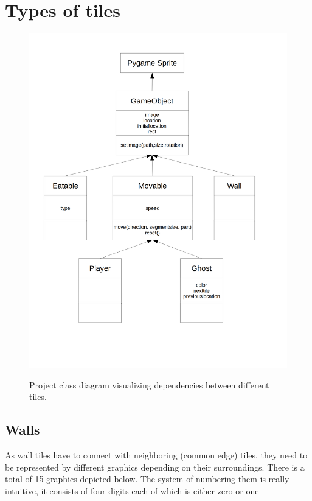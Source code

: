 \documentclass[11pt,a4paper,notitlepage]{report}
\newcommand{\dsubsection}[1]{\FloatBarrier \subsection{#1}}
\newenvironment{img}{
	\begin{center}
		\begin{figure}[H]
			\begin{center}
			
}{
	\end{center}
		\end{figure}
			\end{center}
}
\begin{document}
		\section{Types of tiles}
			\begin{img}
				\includegraphics[width=400pt]{images/class_diagram}\\
				\caption{Project class diagram visualizing dependencies between different tiles.}
			\end{img}
			\dsubsection{Walls}
				\label{walls}
				As wall tiles have to connect with neighboring (common edge) tiles, they need to be represented by different graphics depending on their surroundings. 
				There is a total of 15 graphics depicted below. The system of numbering them is really intuitive, it consists of four digits each of which is either zero or one
				
\end{document}
